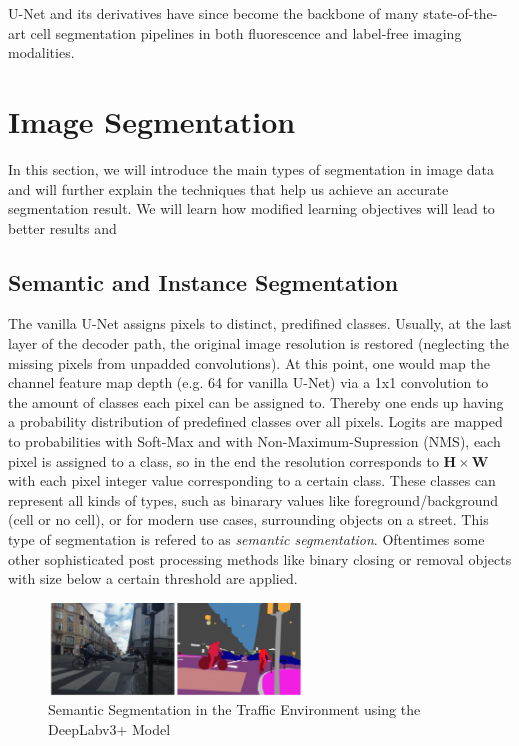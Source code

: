 U-Net and its derivatives have since become the backbone of many state-of-the-art cell segmentation pipelines in both fluorescence and label-free imaging modalities.

\section{Image Segmentation}

In this section, we will introduce the main types of segmentation in image data and will further explain the techniques that help us achieve an accurate segmentation result. We will learn how modified learning objectives will lead to better results and 


\subsection{Semantic and Instance Segmentation}


The vanilla U-Net assigns pixels to distinct, predifined classes. Usually, at the last layer of the decoder path, the original image resolution is restored (neglecting the missing pixels from unpadded convolutions). At this point, one would map the channel feature map depth (e.g. 64 for vanilla U-Net) via a 1x1 convolution to the amount of classes each pixel can be assigned to. Thereby one ends up having a probability distribution of predefined classes over all pixels. Logits are mapped to probabilities with Soft-Max and with Non-Maximum-Supression (NMS), each pixel is assigned to a class, so in the end the resolution corresponds to $\mathbf{H \times W}$ with each pixel integer value corresponding to a certain class. These classes can represent all kinds of types, such as binarary values like foreground/background (cell or no cell), or for modern use cases, surrounding objects on a street. This type of segmentation is refered to as \textit{semantic segmentation}. Oftentimes some other sophisticated post processing methods like binary closing or removal objects with size below a certain threshold are applied.

\begin{figure}[!ht]
    \centering
    \includegraphics[width=0.6\textwidth]{Images/SOTA/SemanticSeg.png}
    \caption{Semantic Segmentation in the Traffic Environment using the DeepLabv3+ Model}
    \label{fig:semanticSeg}
\end{figure}


